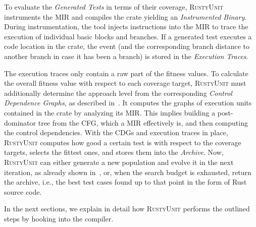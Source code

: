 \documentclass[paper=a4,%
  twoside,%
  BCOR4mm,%
  abstract=true,%
  toc=bibliography,%
  chapterprefix=true,%
  toc=bibliographynumbered,%
  open=right,%
  english,%
  pagesize=pdftex]{scrreprt}
\newcommand{\tech}{\textsc{RustyUnit}\xspace}
\newcommand{\mir}{\ac{MIR}\xspace}
\newcommand{\cfg}{\ac{CFG}\xspace}
\newcommand{\cdgs}{\acp{CDG}\xspace}
\begin{document}
To evaluate the \emph{Generated Tests} in terms of their coverage, \tech instruments the \mir and compiles the crate yielding an \emph{Instrumented Binary}. During instrumentation, the tool injects instructions into the \mir to trace the execution of individual basic blocks and branches. If a generated test executes a code location in the crate, the event (and the corresponding branch distance to another branch in case it has been a branch) is stored in the \emph{Execution Traces}.

The execution traces only contain a raw part of the fitness values. To calculate the overall fitness value with respect to each coverage target, \tech must additionally determine the approach level from the corresponding \emph{Control Dependence Graphs}, as described in~. It computes the graphs of execution units contained in the crate by analyzing its \mir. This implies building a post-dominator tree from the \cfg, which a \mir effectively is, and then computing the control dependencies. With the \cdgs and execution traces in place, \tech computes how good a certain test is with respect to the coverage targets, selects the fittest ones, and stores them into the \emph{Archive}. Now, \tech can either generate a new population and evolve it in the next iteration, as already shown in~, or, when the search budget is exhausted, return the archive, i.e., the best test cases found up to that point in the form of Rust source code.

In the next sections, we explain in detail how \tech performs the outlined steps by hooking into the compiler.
\end{document}
